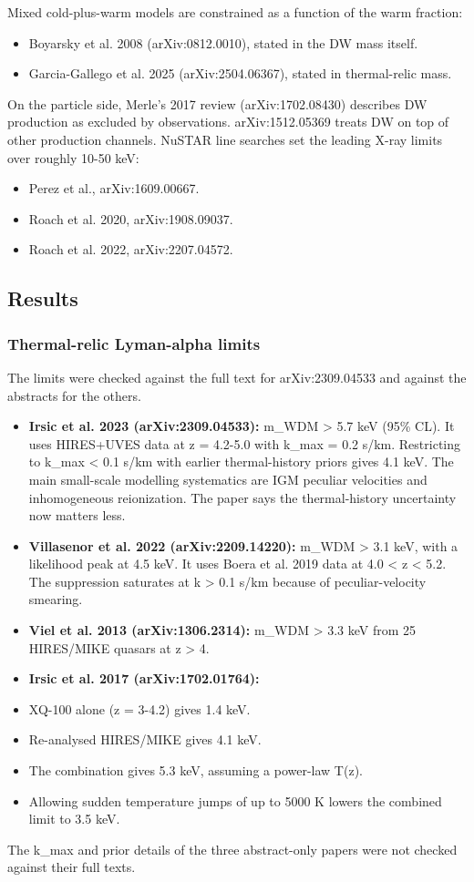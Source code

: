 \documentclass[11pt,a4paper]{article}
\begin{document}
Mixed cold-plus-warm models are constrained as a function of the warm fraction:

\begin{itemize}
  \item Boyarsky et al. 2008 (arXiv:0812.0010), stated in the DW mass itself.
  \item Garcia-Gallego et al. 2025 (arXiv:2504.06367), stated in thermal-relic mass.
\end{itemize}
On the particle side, Merle's 2017 review (arXiv:1702.08430) describes DW production as excluded by observations. arXiv:1512.05369 treats DW on top of other production channels. NuSTAR line searches set the leading X-ray limits over roughly 10-50 keV:

\begin{itemize}
  \item Perez et al., arXiv:1609.00667.
  \item Roach et al. 2020, arXiv:1908.09037.
  \item Roach et al. 2022, arXiv:2207.04572.
\end{itemize}
\subsection{Results}
\subsubsection{Thermal-relic Lyman-alpha limits}
The limits were checked against the full text for arXiv:2309.04533 and against the abstracts for the others.

\begin{itemize}
  \item \textbf{Irsic et al. 2023 (arXiv:2309.04533):} m\_WDM \textgreater{} 5.7 keV (95\% CL). It uses HIRES+UVES data at z = 4.2-5.0 with k\_max = 0.2 s/km. Restricting to k\_max \textless{} 0.1 s/km with earlier thermal-history priors gives 4.1 keV. The main small-scale modelling systematics are IGM peculiar velocities and inhomogeneous reionization. The paper says the thermal-history uncertainty now matters less.
  \item \textbf{Villasenor et al. 2022 (arXiv:2209.14220):} m\_WDM \textgreater{} 3.1 keV, with a likelihood peak at 4.5 keV. It uses Boera et al. 2019 data at 4.0 \textless{} z \textless{} 5.2. The suppression saturates at k \textgreater{} 0.1 s/km because of peculiar-velocity smearing.
  \item \textbf{Viel et al. 2013 (arXiv:1306.2314):} m\_WDM \textgreater{} 3.3 keV from 25 HIRES/MIKE quasars at z \textgreater{} 4.
  \item \textbf{Irsic et al. 2017 (arXiv:1702.01764):}
  \item XQ-100 alone (z = 3-4.2) gives 1.4 keV.
  \item Re-analysed HIRES/MIKE gives 4.1 keV.
  \item The combination gives 5.3 keV, assuming a power-law T(z).
  \item Allowing sudden temperature jumps of up to 5000 K lowers the combined limit to 3.5 keV.
\end{itemize}
The k\_max and prior details of the three abstract-only papers were not checked against their full texts.
\end{document}
